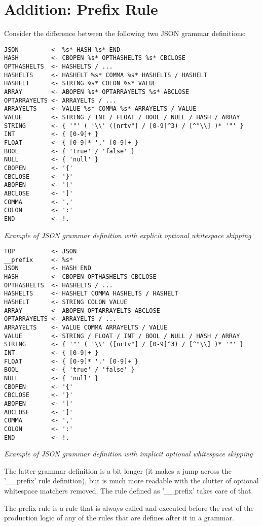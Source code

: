 \section{Addition: Prefix Rule}

Consider the difference between the following two JSON grammar
definitions:

\begin{myquote}
\begin{verbatim}
JSON         <- %s* HASH %s* END
HASH         <- CBOPEN %s* OPTHASHELTS %s* CBCLOSE
OPTHASHELTS  <- HASHELTS / ...
HASHELTS     <- HASHELT %s* COMMA %s* HASHELTS / HASHELT
HASHELT      <- STRING %s* COLON %s* VALUE
ARRAY        <- ABOPEN %s* OPTARRAYELTS %s* ABCLOSE
OPTARRAYELTS <- ARRAYELTS / ...
ARRAYELTS    <- VALUE %s* COMMA %s* ARRAYELTS / VALUE
VALUE        <- STRING / INT / FLOAT / BOOL / NULL / HASH / ARRAY
STRING       <- { '"' ( '\\' ([nrtv"] / [0-9]^3) / [^"\\] )* '"' }
INT          <- { [0-9]+ }
FLOAT        <- { [0-9]* '.' [0-9]+ }
BOOL         <- { 'true' / 'false' }
NULL         <- { 'null' }
CBOPEN       <- '{'
CBCLOSE      <- '}'
ABOPEN       <- '['
ABCLOSE      <- ']'
COMMA        <- ','
COLON        <- ':'
END          <- !.

\end{verbatim}
\end{myquote}
\textit{Example of JSON grammar definition with explicit optional whitespace skipping}

\begin{myquote}
\begin{verbatim}
TOP          <- JSON
__prefix     <- %s*
JSON         <- HASH END
HASH         <- CBOPEN OPTHASHELTS CBCLOSE
OPTHASHELTS  <- HASHELTS / ...
HASHELTS     <- HASHELT COMMA HASHELTS / HASHELT
HASHELT      <- STRING COLON VALUE
ARRAY        <- ABOPEN OPTARRAYELTS ABCLOSE
OPTARRAYELTS <- ARRAYELTS / ...
ARRAYELTS    <- VALUE COMMA ARRAYELTS / VALUE
VALUE        <- STRING / FLOAT / INT / BOOL / NULL / HASH / ARRAY
STRING       <- { '"' ( '\\' ([nrtv"] / [0-9]^3) / [^"\\] )* '"' }
INT          <- { [0-9]+ }
FLOAT        <- { [0-9]* '.' [0-9]+ }
BOOL         <- { 'true' / 'false' }
NULL         <- { 'null' }
CBOPEN       <- '{'
CBCLOSE      <- '}'
ABOPEN       <- '['
ABCLOSE      <- ']'
COMMA        <- ','
COLON        <- ':'
END          <- !.

\end{verbatim}
\end{myquote}
\textit{Example of JSON grammar definition with implicit optional whitespace skipping}

The latter grammar definition is a bit longer (it makes a jump across the '\_\_prefix'
rule definition), but is much more readable with the clutter of optional whitespace
matchers removed. The rule defined as '\_\_prefix' takes care of that.

The prefix rule is a rule that is always called and executed
before the rest of the production logic of any of the rules
that are defines after it in a grammar.
